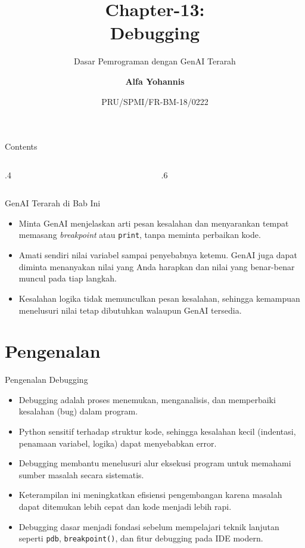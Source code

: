 \documentclass[aspectratio=169, table]{beamer}
\subtitle{Dasar Pemrograman dengan GenAI Terarah}
\title{Chapter-13:\\\LARGE{Debugging\\}
\vspace{10pt}}
\date[Serial]{\scriptsize {PRU/SPMI/FR-BM-18/0222}}
\author[Pradita]{\small{\textbf{Alfa Yohannis}}}
\begin{document}
\frame{\titlepage}

\begin{frame}[fragile]{Contents}
\vspace{15pt}
\begin{columns}[t]
\begin{column}{.4\textwidth}
\tableofcontents[sections={1-4}]
\end{column}
\begin{column}{.6\textwidth}
\tableofcontents[sections={5-7}]
\end{column}
\end{columns}
\end{frame}

\begin{frame}{GenAI Terarah di Bab Ini}
\small
\begin{itemize}
  \item Minta GenAI menjelaskan arti pesan kesalahan dan menyarankan tempat memasang \textit{breakpoint} atau \texttt{print}, tanpa meminta perbaikan kode.
  \item Amati sendiri nilai variabel sampai penyebabnya ketemu. GenAI juga dapat diminta menanyakan nilai yang Anda harapkan dan nilai yang benar-benar muncul pada tiap langkah.
  \item Kesalahan logika tidak memunculkan pesan kesalahan, sehingga kemampuan menelusuri nilai tetap dibutuhkan walaupun GenAI tersedia.
\end{itemize}
\end{frame}

\section{Pengenalan}
\begin{frame}{Pengenalan Debugging}
\vspace{20pt}

\begin{itemize}
    \item Debugging adalah proses menemukan, menganalisis, dan memperbaiki kesalahan (bug) dalam program.
    \item Python sensitif terhadap struktur kode, sehingga kesalahan kecil (indentasi, penamaan variabel, logika) dapat menyebabkan error.
    \item Debugging membantu menelusuri alur eksekusi program untuk memahami sumber masalah secara sistematis.
    \item Keterampilan ini meningkatkan efisiensi pengembangan karena masalah dapat ditemukan lebih cepat dan kode menjadi lebih rapi.
    \item Debugging dasar menjadi fondasi sebelum mempelajari teknik lanjutan seperti \texttt{pdb}, \texttt{breakpoint()}, dan fitur debugging pada IDE modern.
\end{itemize}

\end{frame}
\end{document}
